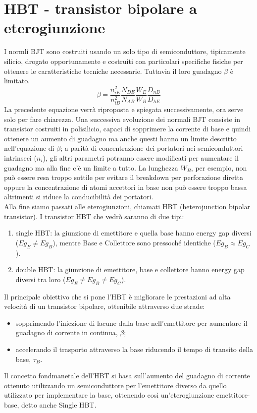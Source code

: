 \cleardoublepage
\section{HBT - transistor bipolare a eterogiunzione}
I normli BJT sono costruiti usando un solo tipo di semiconduttore, tipicamente silicio, drogato opportunamente e costruiti con particolari specifiche fisiche per ottenere le caratteristiche tecniche necessarie. Tuttavia il loro guadagno $\beta$ è limitato.
\begin{equation}
    \beta = \dfrac{n_{iE}^2}{n_{iB}^2} \dfrac{N_{DE}}{N_{AB}} \dfrac{W_E}{W_B} \dfrac{D_{nB}}{D_{hE}}
\end{equation}
La precedente equazione verrà riproposta e spiegata successivamente, ora serve solo per fare chiarezza.
Una successiva evoluzione dei normali BJT consiste in transistor costruiti in polisilicio, capaci di sopprimere la corrente di base e quindi ottenere un aumento di guadagno ma anche questi hanno un limite descritto nell'equazione di $\beta$; a parità di concentrazione dei portatori nei semiconduttori intrinseci ($n_i$), gli altri parametri potranno essere modificati per aumentare il guadagno ma alla fine c'è un limite a tutto. La lunghezza $W_B$, per esempio, non può essere resa troppo sottile per evitare il breakdown per perforazione diretta oppure la concentrazione di atomi accettori in base non può essere troppo bassa altrimenti si riduce la conducibilità dei portatori.\\
Alla fine siamo passati alle eterogiunzioni, chiamati HBT (heterojunction bipolar transistor).
I transistor HBT che vedrò saranno di due tipi:
%
\begin{enumerate}
    \item single HBT:
     la giunzione di emettitore e quella base hanno energy gap diversi ($Eg_E \neq Eg_B$), mentre Base e Collettore sono pressoché identiche ($Eg_B \approx Eg_C$).
    \item double HBT:
    la giunzione di emettitore, base e collettore hanno energy gap diversi tra loro ($Eg_E \neq Eg_B\neq Eg_C$).
\end{enumerate}
%
Il principale obiettivo che si pone l'HBT è migliorare le prestazioni ad alta velocità di un transistor bipolare, ottenibile attraverso due strade:
%
\begin{itemize}
    \item sopprimendo l'iniezione di lacune dalla base nell'emettitore per aumentare il guadagno di corrente in continua, $\beta$; 
    \item accelerando il trasporto attraverso la base riducendo il tempo di transito della base, $\tau_B$.
\end{itemize}
%
Il concetto fondmanetale dell'HBT si basa sull'aumento del guadagno di corrente ottenuto utilizzando un semiconduttore per l'emettitore diverso da quello utilizzato per implementare la base, ottenendo così un'eterogiunzione emettitore-base, detto anche Single HBT.\\
%
\cleardoublepage
